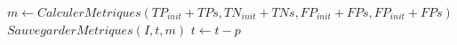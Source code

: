 {\begin{minipage}{0.75\linewidth}
\begin{algorithm}[H]
\begin{algorithmic}
            \State  $ m \gets CalculerMetriques(TP_{init}+TP{s},TN_{init}+TN{s},FP_{init}+FP{s},FP_{init}+FP{s})$
            \State  $ SauvegarderMetriques(I,t,m)$
            \State $ t \gets t - p$ 
               
          \EndWhile
      \end{algorithmic}

  \end{algorithm}
\end{minipage}
}








